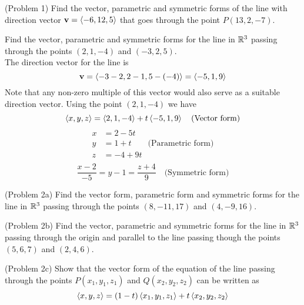 \documentclass[handout]{ximera}
\begin{document}
\begin{problem}(Problem 1)
Find the vector, parametric and symmetric forms of the line with direction 
vector $\mathbf{v} = \left\langle -6, 12, 5\right\rangle$ that goes through the point $P(13, 2, -7)$. \\
\end{problem}

\begin{example}[Example 2]
Find the vector, parametric and symmetric forms for the line in $\mathbb R^3$ passing 
through the points $(2, 1, -4)$ and $(-3, 2, 5)$.\\
The direction vector for the line is 
\[
\mathbf{v} = \left\langle -3-2, 2-1, 5-(-4)\right\rangle = \left\langle -5, 1, 9\right\rangle
\]
Note that any non-zero multiple of this vector would also serve as a suitable direction vector. 
Using the point $(2, 1, -4)$ we have
\[
\left\langle x, y, z\right\rangle = \left\langle 2, 1, -4\right\rangle + t\left\langle -5, 1, 9\right\rangle \quad \text{(Vector form)}
\]
\begin{align*}
x &= 2 -5t\\
y &= 1 + t \quad\quad\text{(Parametric form)}\\
z &= -4 + 9t\\
\end{align*}
\[
\frac{x-2}{-5} = y-1 = \frac{z+4}{9} \quad \text{(Symmetric form)}
\]
\end{example}

\begin{problem}(Problem 2a)
Find the vector form, parametric form and symmetric forms for the line in $\mathbb R^3$ passing 
through the points $(8, -11, 17)$ and $(4, -9, 16)$.\\
\end{problem}

\begin{problem}(Problem 2b)
Find the vector, parametric and symmetric forms for the line in $\mathbb R^3$ passing through the origin 
and parallel to the line passing though the points $(5, 6, 7)$ and $(2, 4, 6)$.\\
\end{problem}

\begin{problem}(Problem 2c)
Show that the vector form of the equation of the line passing through the 
points $P(x_1, y_1, z_1)$ and $Q(x_2, y_2, z_2)$
can be written as
\[
\left\langle x,y,z\right\rangle = (1-t)\left\langle x_1, y_1, z_1\right\rangle + t\left\langle x_2, y_2, z_2\right\rangle
\]
\end{problem}
\end{document}
